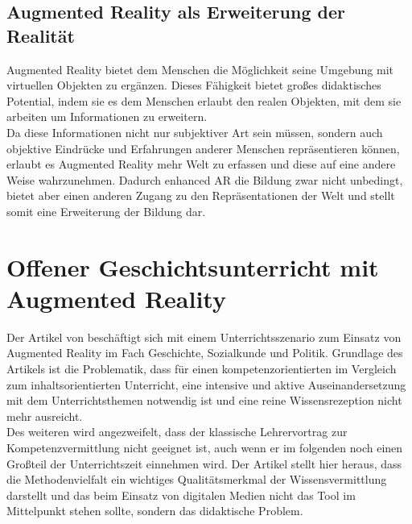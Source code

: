 \subsection{Augmented Reality als Erweiterung der Realität}
Augmented Reality bietet dem Menschen die Möglichkeit seine Umgebung mit virtuellen Objekten zu ergänzen. Dieses Fähigkeit bietet großes didaktisches Potential, indem sie es dem Menschen erlaubt den realen Objekten, mit dem sie arbeiten um Informationen zu erweitern.\\
Da diese Informationen nicht nur subjektiver Art sein müssen, sondern auch objektive Eindrücke und Erfahrungen anderer Menschen repräsentieren können, erlaubt es Augmented Reality mehr Welt zu erfassen und diese auf eine andere Weise wahrzunehmen. Dadurch \glqq enhanced\grqq{} AR die Bildung zwar nicht unbedingt, bietet aber einen anderen Zugang zu den Repräsentationen der Welt und stellt somit eine Erweiterung der Bildung dar.


\section{Offener Geschichtsunterricht mit Augmented Reality}
Der Artikel \citep{buchner:ar-geschichtsunterricht} von \citeauthor{buchner:ar-geschichtsunterricht} beschäftigt sich mit einem Unterrichtsszenario zum Einsatz von Augmented Reality im Fach Geschichte, Sozialkunde und Politik. 
Grundlage des Artikels ist die Problematik, dass für einen kompetenzorientierten im Vergleich zum inhaltsorientierten Unterricht, eine intensive und aktive Auseinandersetzung mit dem Unterrichtsthemen notwendig ist und eine reine Wissensrezeption nicht mehr ausreicht.\\ 
Des weiteren wird angezweifelt, dass der klassische Lehrervortrag zur Kompetenzvermittlung nicht geeignet ist, auch wenn er im folgenden noch einen Großteil der Unterrichtszeit einnehmen wird. Der Artikel stellt hier heraus, dass die Methodenvielfalt ein wichtiges Qualitätsmerkmal der Wissensvermittlung darstellt und das beim Einsatz von digitalen Medien nicht das Tool im Mittelpunkt stehen sollte, sondern das didaktische Problem.\\

